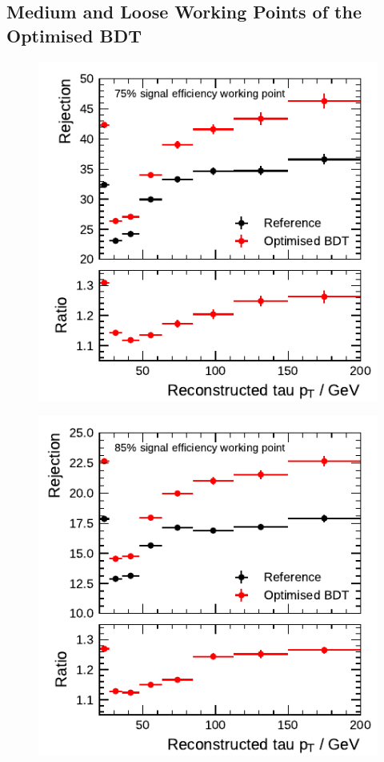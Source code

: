 \subsection{Medium and Loose Working Points of the Optimised BDT}
\label{app:bdt_working_point_rejection}
\noindent
\begin{minipage}{\textwidth}
  \captionsetup{type=figure}
  \begin{subfigure}{0.48\textwidth}
    \centering
    \includegraphics{./figures/bdt_perf/post_optimisation/rejection_medium_1p.pdf}
  \end{subfigure}\hfill
  \begin{subfigure}{0.48\textwidth}
    \centering
    \includegraphics{./figures/bdt_perf/post_optimisation/rejection_loose_1p.pdf}

\end{subfigure}
\end{minipage}
